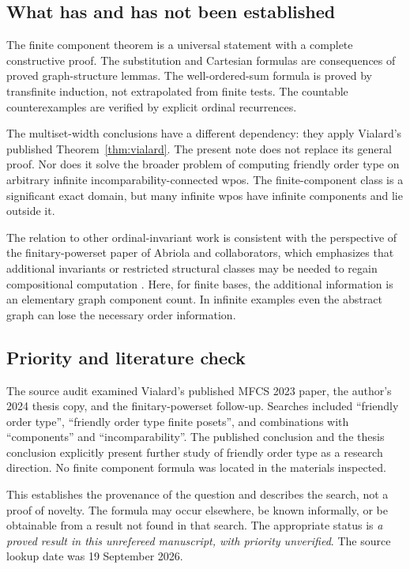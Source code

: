 \documentclass[11pt,a4paper]{article}
\theoremstyle{definition}
\theoremstyle{remark}
\begin{document}
\subsection{What has and has not been established}

The finite component theorem is a universal statement with a complete
constructive proof. The substitution and Cartesian formulas are consequences
of proved graph-structure lemmas. The well-ordered-sum formula is proved by
transfinite induction, not extrapolated from finite tests. The countable
counterexamples are verified by explicit ordinal recurrences.

The multiset-width conclusions have a different dependency: they apply
Vialard's published Theorem~\ref{thm:vialard}. The present note does not
replace its general proof. Nor does it solve the broader problem of
computing friendly order type on arbitrary infinite incomparability-connected
wpos. The finite-component class is a significant exact domain, but many
infinite wpos have infinite components and lie outside it.

The relation to other ordinal-invariant work is consistent with the
perspective of the finitary-powerset paper of Abriola and collaborators,
which emphasizes that additional invariants or restricted structural classes
may be needed to regain compositional computation \cite{abriola2024}.
Here, for finite bases, the additional information is an elementary graph
component count. In infinite examples even the abstract graph can lose the
necessary order information.

\subsection{Priority and literature check}

The source audit examined Vialard's published MFCS 2023 paper, the author's
2024 thesis copy, and the finitary-powerset follow-up. Searches included
``friendly order type'', ``friendly order type finite posets'', and
combinations with ``components'' and ``incomparability''. The published
conclusion and the thesis conclusion explicitly present further study of
friendly order type as a research direction. No finite component formula
was located in the materials inspected.

This establishes the provenance of the question and describes the search,
not a proof of novelty. The formula may occur elsewhere, be known
informally, or be obtainable from a result not found in that search. The
appropriate status is \emph{a proved result in this unrefereed manuscript,
with priority unverified}. The source lookup date was 19 September 2026.
\end{document}
